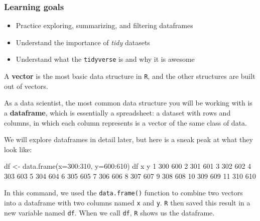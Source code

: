 \documentclass[
]{book}
\newenvironment{Shaded}{\begin{snugshade}}{\end{snugshade}}
\newcommand{\AttributeTok}[1]{\textcolor[rgb]{0.77,0.63,0.00}{#1}}
\newcommand{\DecValTok}[1]{\textcolor[rgb]{0.00,0.00,0.81}{#1}}
\newcommand{\FunctionTok}[1]{\textcolor[rgb]{0.00,0.00,0.00}{#1}}
\newcommand{\NormalTok}[1]{#1}
\newcommand{\OtherTok}[1]{\textcolor[rgb]{0.56,0.35,0.01}{#1}}
\newcommand{\SpecialCharTok}[1]{\textcolor[rgb]{0.00,0.00,0.00}{#1}}
\providecommand{\tightlist}{%
  \setlength{\itemsep}{0pt}\setlength{\parskip}{0pt}}
\begin{document}
\hypertarget{learning-goals-10}{%
\subsubsection*{Learning goals}\label{learning-goals-10}}

\begin{itemize}
\tightlist
\item
  Practice exploring, summarizing, and filtering dataframes
\item
  Understand the importance of \emph{tidy} datasets
\item
  Understand what the \texttt{tidyverse} is and why it is awesome
\end{itemize}

A \textbf{vector} is the most basic data structure in \texttt{R}, and the other structures are built out of vectors.

As a data scientist, the most common data structure you will be working with is a \textbf{dataframe}, which is essentially a spreadsheet: a dataset with rows and columns, in which each column represents is a vector of the same class of data.

We will explore dataframes in detail later, but here is a sneak peak at what they look like:

\begin{Shaded}
\begin{Highlighting}[]
\NormalTok{df }\OtherTok{\textless{}{-}} \FunctionTok{data.frame}\NormalTok{(}\AttributeTok{x=}\DecValTok{300}\SpecialCharTok{:}\DecValTok{310}\NormalTok{,}
           \AttributeTok{y=}\DecValTok{600}\SpecialCharTok{:}\DecValTok{610}\NormalTok{)}
\NormalTok{df}
\NormalTok{     x   y}
\DecValTok{1}  \DecValTok{300} \DecValTok{600}
\DecValTok{2}  \DecValTok{301} \DecValTok{601}
\DecValTok{3}  \DecValTok{302} \DecValTok{602}
\DecValTok{4}  \DecValTok{303} \DecValTok{603}
\DecValTok{5}  \DecValTok{304} \DecValTok{604}
\DecValTok{6}  \DecValTok{305} \DecValTok{605}
\DecValTok{7}  \DecValTok{306} \DecValTok{606}
\DecValTok{8}  \DecValTok{307} \DecValTok{607}
\DecValTok{9}  \DecValTok{308} \DecValTok{608}
\DecValTok{10} \DecValTok{309} \DecValTok{609}
\DecValTok{11} \DecValTok{310} \DecValTok{610}
\end{Highlighting}
\end{Shaded}

In this command, we used the \texttt{data.frame()} function to combine two vectors into a dataframe with two columns named \texttt{x} and \texttt{y}. \texttt{R} then saved this result in a new variable named \texttt{df}. When we call \texttt{df}, \texttt{R} shows us the dataframe.
\end{document}
